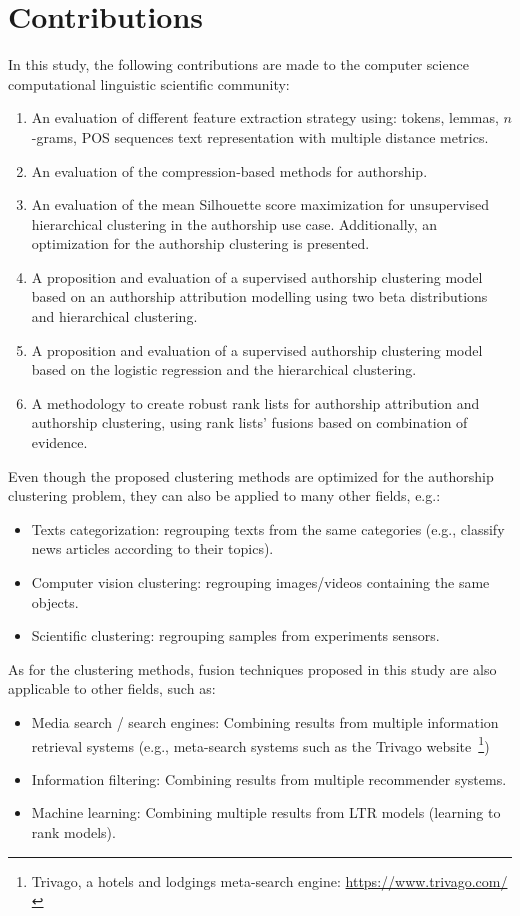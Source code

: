 \section{Contributions}

In this study, the following contributions are made to the computer science computational linguistic scientific community:

\begin{enumerate}
  \item
  An evaluation of different feature extraction strategy using: tokens, lemmas, $n$-grams, POS sequences text representation with multiple distance metrics.
  \item
  An evaluation of the compression-based methods for authorship.
  \item
  An evaluation of the mean Silhouette score maximization for unsupervised hierarchical clustering in the authorship use case. Additionally, an optimization for the authorship clustering is presented.
  \item
  A proposition and evaluation of a supervised authorship clustering model based on an authorship attribution modelling using two beta distributions and hierarchical clustering.
  \item
  A proposition and evaluation of a supervised authorship clustering model based on the logistic regression and the hierarchical clustering.
  \item
  A methodology to create robust rank lists for authorship attribution and authorship clustering, using rank lists' fusions based on combination of evidence.
\end{enumerate}

Even though the proposed clustering methods are optimized for the authorship clustering problem, they can also be applied to many other fields, e.g.:
\begin{itemize}
  \item
  Texts categorization: regrouping texts from the same categories (e.g., classify news articles according to their topics).
  \item
  Computer vision clustering: regrouping images/videos containing the same objects.
  \item
  Scientific clustering: regrouping samples from experiments sensors.
\end{itemize}

As for the clustering methods, fusion techniques proposed in this study are also applicable to other fields, such as:
\begin{itemize}
  \item
  Media search / search engines: Combining results from multiple information retrieval systems (e.g., meta-search systems such as the Trivago website~\footnote{Trivago, a hotels and lodgings meta-search engine: \url{https://www.trivago.com/}})
  \item
  Information filtering: Combining results from multiple recommender systems.
  \item
  Machine learning: Combining multiple results from LTR models (learning to rank models).
\end{itemize}
